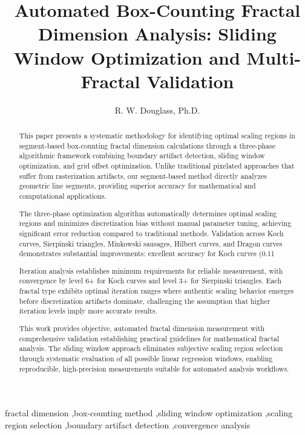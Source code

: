 \documentclass[preprint,12pt]{elsarticle}
\begin{document}
\begin{frontmatter}

\title{Automated Box-Counting Fractal Dimension Analysis: Sliding Window Optimization and Multi-Fractal Validation}

\author{R. W. Douglass, Ph.D.}



\begin{abstract}
This paper presents a systematic methodology for identifying optimal scaling regions in segment-based box-counting fractal dimension calculations through a three-phase algorithmic framework combining boundary artifact detection, sliding window optimization, and grid offset optimization. Unlike traditional pixelated approaches that suffer from rasterization artifacts, our segment-based method directly analyzes geometric line segments, providing superior accuracy for mathematical and computational applications.

The three-phase optimization algorithm automatically determines optimal scaling regions and minimizes discretization bias without manual parameter tuning, achieving significant error reduction compared to traditional methods. Validation across Koch curves, Sierpinski triangles, Minkowski sausages, Hilbert curves, and Dragon curves demonstrates substantial improvements: excellent accuracy for Koch curves (0.11%

Iteration analysis establishes minimum requirements for reliable measurement, with convergence by level 6+ for Koch curves and level 3+ for Sierpinski triangles. Each fractal type exhibits optimal iteration ranges where authentic scaling behavior emerges before discretization artifacts dominate, challenging the assumption that higher iteration levels imply more accurate results.

This work provides objective, automated fractal dimension measurement with comprehensive validation establishing practical guidelines for mathematical fractal analysis. The sliding window approach eliminates subjective scaling region selection through systematic evaluation of all possible linear regression windows, enabling reproducible, high-precision measurements suitable for automated analysis workflows.
\end{abstract}

\begin{keyword}
fractal dimension \sep box-counting method \sep sliding window optimization \sep scaling region selection \sep boundary artifact detection \sep convergence analysis
\end{keyword}

\end{frontmatter}
\end{document}
